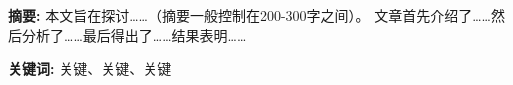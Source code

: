 \textbf{摘\quad 要:}
{
  本文旨在探讨……（摘要一般控制在200-300字之间）。
  文章首先介绍了……然后分析了……最后得出了……结果表明……
}

\textbf{关键词:}
{
  关键、关键、关键
}
